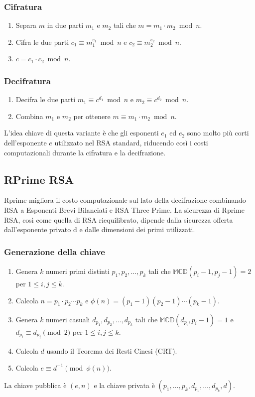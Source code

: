 \documentclass[a4paper,12pt]{report}
\begin{document}
\subsubsection*{Cifratura}
\begin{enumerate}
    \item Separa $m$ in due parti $m_1$ e $m_2$ tali che $m = m_1 \cdot m_2 \bmod n$.
    \item Cifra le due parti $c_1 \equiv m_1^{e_1} \bmod n$ e $c_2 \equiv m_2^{e_2} \bmod n$.
    \item $c = c_1 \cdot c_2 \bmod n$.
\end{enumerate}

\subsubsection*{Decifratura}
\begin{enumerate}
    \item Decifra le due parti $m_1 \equiv c^{d_1} \bmod n$ e $m_2 \equiv c^{d_2} \bmod n$.
    \item Combina $m_1$ e $m_2$ per ottenere $m \equiv m_1 \cdot m_2 \bmod n$.
\end{enumerate}

L'idea chiave di questa variante è che gli esponenti $e_1$ ed $e_2$ sono molto più corti dell'esponente $e$ utilizzato nel RSA standard, riducendo così i costi computazionali durante la cifratura e la decifrazione.

\subsection{RPrime RSA} \cite{Nasution_2020}
Rprime migliora il costo computazionale sul lato della decifrazione combinando RSA a Esponenti Brevi Bilanciati e RSA Three Prime. 
La sicurezza di Rprime RSA, così come quella di RSA riequilibrato, dipende dalla sicurezza offerta dall'esponente privato d e dalle dimensioni dei primi utilizzati.
\subsubsection*{Generazione della chiave}
\begin{enumerate}
\item Genera $k$ numeri primi distinti $p_1, p_2, \ldots, p_k$ tali che $\mathbb{MCD}(p_i - 1, p_j - 1) = 2$ per $1 \leq i, j \leq k$.
\item Calcola $n = p_1 \cdot p_2 \cdots p_k$ e $\phi(n) = (p_1 - 1)(p_2 - 1) \cdots (p_k - 1)$.
\item Genera $k$ numeri casuali $d_{p_1}, d_{p_2}, \ldots, d_{p_k}$ tali che $\mathbb{MCD}(d_{p_i}, p_i - 1) = 1$ e $d_{p_i} \equiv d_{p_j} \pmod{2}$ per $1 \leq i, j \leq k$.
\item Calcola $d$ usando il Teorema dei Resti Cinesi (CRT).
\item Calcola $e \equiv d^{-1} \pmod{\phi(n)}$.
\end{enumerate}
La chiave pubblica è $(e, n)$ e la chiave privata è $(p_1, \ldots, p_k, d_{p_1}, \ldots, d_{p_k}, d)$.
\end{document}
